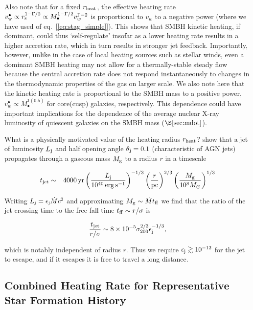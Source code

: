 \documentclass[usenatbib,fleqn]{mn2e}
\begin{document}
Also note that for a fixed $r_{\rm heat}$, the effective heating rate
$v_{\rm w}^{\bullet} \propto r_{\rm s}^{1-\Gamma/2} \propto
M_{\bullet}^{1-\Gamma/2}v_{w}^{\Gamma-2}$ is proportional to $v_{w}$
to a negative power (where we have used of
eq.~[\ref{eq:stag_simple}]).  This shows that SMBH kinetic heating, if
dominant, could thus `self-regulate' insofar as a lower heating rate
results in a higher accretion rate, which in turn results in stronger
jet feedback.  Importantly, however, unlike in the case of local
heating sources such as stellar winds, even a dominant SMBH heating
may not allow for a thermally-stable steady flow because the central
accretion rate does not respond instantaneously to changes in the
thermodynamic properties of the gas on larger scale.  We also note
here that the kinetic heating rate is proportional to the SMBH mass to
a positive power, $v_{w}^{\bullet} \propto M_{\bullet}^{1(0.5)}$ for
core(cusp) galaxies, respectively. This dependence could have
important implications for the dependence of the average nuclear X-ray
luminosity of quiescent galaxies on the SMBH mass
($\S\ref{sec:mdot}$).

What is a physically motivated value of the heating radius $r_{\rm
  heat}$?  \citet{Bromberg+11} show that a jet of luminosity $L_{\rm
  j}$ and half opening angle $\theta_{\rm j} = 0.1$ (characteristic of
AGN jets) propagates through a gaseous mass $M_{\rm g}$ to a radius
$r$ in a timescale

\begin{eqnarray}
t_{\rm jet} &\sim& 4000\,{\rm yr}\left(\frac{{L}_{\rm j}}{10^{40}\,\rm erg\,s^{-1}}\right)^{-1/3}\left(\frac{r}{\rm pc}\right)^{2/3}\left(\frac{M_{\rm g}}{10^{8}M_{\odot}}\right)^{1/3} 
\end{eqnarray}

Writing $L_{\rm j} = \epsilon_{\rm j}\dot{M}c^{2}$ and approximating
$M_{\rm g} \sim \dot{M}t_{\rm ff}$ we find that the ratio of the jet
crossing time to the free-fall time $t_{\rm ff} \sim r/\sigma$ is 

\begin{equation}
\frac{t_{\rm jet}}{r/\sigma} \sim 8\times 10^{-5}\sigma_{200}^{2/3}\epsilon_{\rm j}^{-1/3},
\end{equation}

which is notably independent of radius $r$.  Thus we require
$\epsilon_{\rm j} \gtrsim 10^{-12}$ for the jet to escape, and if it
escapes it is free to travel a long distance.

\subsection{Combined Heating Rate for Representative Star Formation History} 
\end{document}
